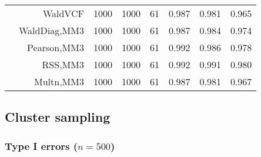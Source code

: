 \documentclass[
]{article}
\begin{document}
\begin{table}[H]
{\begin{tabular}[t]{lrrrrrrr}
\hspace{1em} & WaldVCF & 1000 & 1000 & 61 & 0.987 & 0.981 & 0.965\\

\hspace{1em} & WaldDiag,MM3 & 1000 & 1000 & 61 & 0.987 & 0.984 & 0.974\\

\hspace{1em} & Pearson,MM3 & 1000 & 1000 & 61 & 0.992 & 0.986 & 0.978\\

\hspace{1em} & RSS,MM3 & 1000 & 1000 & 61 & 0.992 & 0.991 & 0.980\\

\hspace{1em} & Multn,MM3 & 1000 & 1000 & 61 & 0.987 & 0.981 & 0.967\\
\bottomrule
\end{tabular}}
\endgroup{}
\end{table}

\subsection{Cluster sampling}\label{cluster-sampling}

\subsubsection{\texorpdfstring{Type I errors
(\(n=500\))}{Type I errors (n=500)}}\label{type-i-errors-n500-1}
\end{document}
